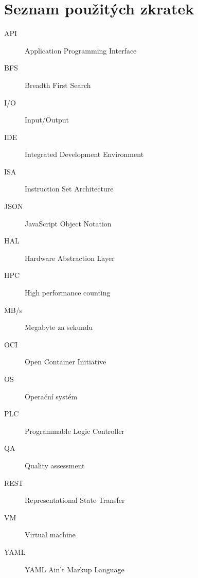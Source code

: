 \chapter{Seznam použitých zkratek}
\begin{description}
	\item[API] Application Programming Interface
	\item[BFS] Breadth First Search 
	\item[I/O] Input/Output
	\item[IDE] Integrated Development Environment 
	\item[ISA] Instruction Set Architecture 
	\item[JSON] JavaScript Object Notation
	\item[HAL] Hardware Abstraction Layer
	\item[HPC] High performance counting
	\item[MB/s] Megabyte za sekundu
	\item[OCI] Open Container Initiative
	\item[OS] Operační systém 
	\item[PLC] Programmable Logic Controller
	\item[QA] Quality assessment 
	\item[REST] Representational State Transfer
	\item[VM] Virtual machine
	\item[YAML] YAML Ain't Markup Language
\end{description}